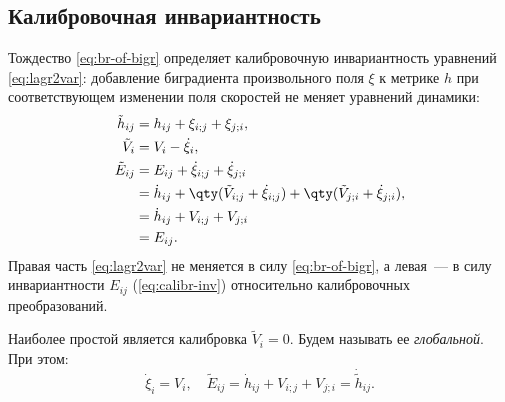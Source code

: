 \documentclass[\docroot/reports/draft/report.tex]{subfiles}
\begin{document}
\subsection{Калибровочная инвариантность}

    Тождество \ref{eq:br-of-bigr} определяет калибровочную инвариантность уравнений \ref{eq:lagr2var}: добавление биградиента произвольного поля $\xi$ к метрике $h$ при соответствующем изменении поля скоростей не меняет уравнений динамики:
    \begin{equation}\begin{aligned}\label{eq:calibr-inv}
        \tilde{h}_{ij} &= h_{ij} + \xi_{i;j} + \xi_{j;i}, \\
        \tilde{V}_i    &= V_i - \dot{\xi}_i, \\
        \tilde{E}_{ij} &= E_{ij} + \dot{\xi}_{i;j} + \dot{\xi}_{j;i} \\
                       &= \dot{h}_{ij} + \qty(\tilde{V}_{i;j} + \dot{\xi}_{i;j}) + \qty(\tilde{V}_{j;i} +  \dot{\xi}_{j;i}), \\
                       &= \dot{h}_{ij} + V_{i;j} + V_{j;i} \\
                       &= E_{ij} .
    \end{aligned}\end{equation}
    Правая часть \autoref{eq:lagr2var} не меняется в силу \autoref{eq:br-of-bigr}, а левая~--- в силу инвариантности $E_{ij}$ (\autoref{eq:calibr-inv}) относительно калибровочных преобразований.

    Наиболее простой является калибровка $\tilde{V}_i = 0$. Будем называть ее \textit{глобальной}. При этом:
    \begin{equation}\label{eq:calibr-glob}
        \dot{\xi}_i = V_i, \quad \tilde{E}_{ij} = \dot{h}_{ij} + V_{i;j} + V_{j;i} = \dot{\tilde{h}}_{ij} .
    \end{equation}

\end{document}
